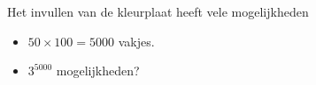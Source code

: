 \documentclass{beamer}
\begin{document}
	
\begin{frame}{Het invullen van de kleurplaat heeft vele mogelijkheden}

\begin{itemize}
	\item $50 \times 100=5000$ vakjes.
	\item $3^{5000}$ mogelijkheden?
\end{itemize}

	
\end{frame}
	
	
\end{document}
